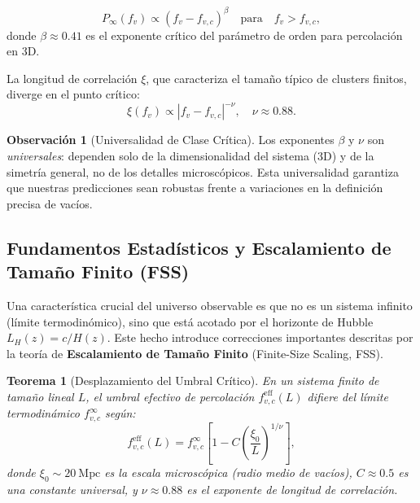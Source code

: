 \documentclass[12pt, a4paper]{article}
\theoremstyle{plain}
\newtheorem{teorema}{Teorema}
\theoremstyle{definition}
\newtheorem{observacion}{Observación}
\begin{document}
\begin{equation}
P_\infty(f_v) \propto (f_v - f_{v,c})^\beta \quad \text{para} \quad f_v > f_{v,c},
\label{eq:scaling_law}
\end{equation}
donde $\beta \approx 0.41$ es el exponente crítico del parámetro de orden para percolación en 3D.

La longitud de correlación $\xi$, que caracteriza el tamaño típico de clusters finitos, diverge en el punto crítico:
\begin{equation}
\xi(f_v) \propto |f_v - f_{v,c}|^{-\nu}, \quad \nu \approx 0.88.
\label{eq:correlation_length}
\end{equation}

\begin{observacion}[Universalidad de Clase Crítica]
Los exponentes $\beta$ y $\nu$ son \textit{universales}: dependen solo de la dimensionalidad del sistema (3D) y de la simetría general, no de los detalles microscópicos. Esta universalidad garantiza que nuestras predicciones sean robustas frente a variaciones en la definición precisa de vacíos.
\end{observacion}

\subsection{Fundamentos Estadísticos y Escalamiento de Tamaño Finito (FSS)}

Una característica crucial del universo observable es que no es un sistema infinito (límite termodinómico), sino que está acotado por el horizonte de Hubble $L_H(z) = c/H(z)$. Este hecho introduce correcciones importantes descritas por la teoría de \textbf{Escalamiento de Tamaño Finito} (Finite-Size Scaling, FSS).

\begin{teorema}[Desplazamiento del Umbral Crítico]
En un sistema finito de tamaño lineal $L$, el umbral efectivo de percolación $f_{v,c}^{\text{eff}}(L)$ difiere del límite termodinámico $f_{v,c}^{\infty}$ según:
\begin{equation}
f_{v,c}^{\text{eff}}(L) = f_{v,c}^{\infty} \left[1 - C \left(\frac{\xi_0}{L}\right)^{1/\nu}\right],
\label{eq:fss_threshold}
\end{equation}
donde $\xi_0 \sim 20~\mathrm{Mpc}$ es la escala microscópica (radio medio de vacíos), $C \approx 0.5$ es una constante universal, y $\nu \approx 0.88$ es el exponente de longitud de correlación.
\end{teorema}
\end{document}
